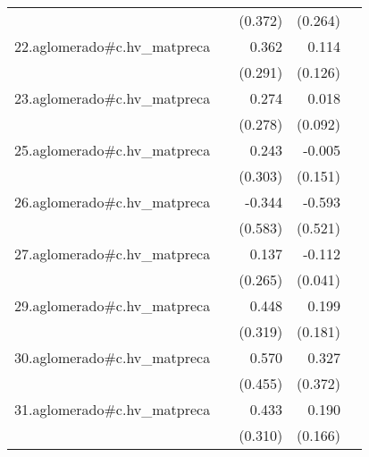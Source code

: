 {\begin{longtable}{l*{4}{D{.}{.}{-1}}}
            &                     &     (0.372)         &     (0.264)         &                     \\
\addlinespace
22.aglomerado#c.hv\_matpreca&                     &       0.362         &       0.114         &                     \\
            &                     &     (0.291)         &     (0.126)         &                     \\
\addlinespace
23.aglomerado#c.hv\_matpreca&                     &       0.274         &       0.018         &                     \\
            &                     &     (0.278)         &     (0.092)         &                     \\
\addlinespace
25.aglomerado#c.hv\_matpreca&                     &       0.243         &      -0.005         &                     \\
            &                     &     (0.303)         &     (0.151)         &                     \\
\addlinespace
26.aglomerado#c.hv\_matpreca&                     &      -0.344         &      -0.593         &                     \\
            &                     &     (0.583)         &     (0.521)         &                     \\
\addlinespace
27.aglomerado#c.hv\_matpreca&                     &       0.137         &      -0.112\sym{**} &                     \\
            &                     &     (0.265)         &     (0.041)         &                     \\
\addlinespace
29.aglomerado#c.hv\_matpreca&                     &       0.448         &       0.199         &                     \\
            &                     &     (0.319)         &     (0.181)         &                     \\
\addlinespace
30.aglomerado#c.hv\_matpreca&                     &       0.570         &       0.327         &                     \\
            &                     &     (0.455)         &     (0.372)         &                     \\
\addlinespace
31.aglomerado#c.hv\_matpreca&                     &       0.433         &       0.190         &                     \\
            &                     &     (0.310)         &     (0.166)         &                     \\

\end{longtable}}
